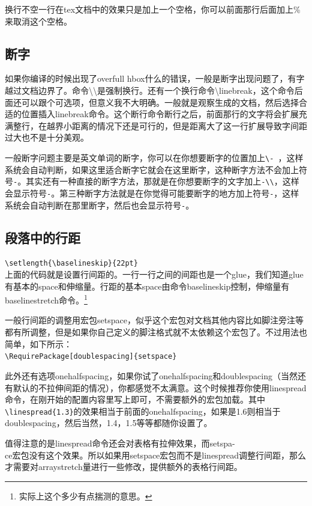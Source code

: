 \documentclass[12pt,oneside]{book}
\begin{document}
\begin{common-format}
换行不空一行在tex文档中的效果只是加上一个空格，你可以前面那行后面加上\%{}来取消这个空格。


\subsection{断字}
如果你编译的时候出现了overfull hbox什么的错误，一般是断字出现问题了，有字越过文档边界了。命令\textbackslash \textbackslash 是强制换行。还有一个换行命令\textbackslash linebreak，这个命令后面还可以跟个可选项，但意义我不大明确。一般就是观察生成的文档，然后选择合适的位置插入linebreak命令。这个断行命令断行之后，前面那行的文字将会扩展充满整行，在越界小距离的情况下还是可行的，但是距离大了这一行扩展导致字间距过大也不是十分美观。

一般断字问题主要是英文单词的断字，你可以在你想要断字的位置加上\verb+\- +，这样系统会自动判断，如果这里适合断字它就会在这里断字，这种断字方法不会加上符号\verb+-+。其实还有一种直接的断字方法，那就是在你想要断字的文字加上\verb+-\\+，这样会显示符号\verb+-+。第三种断字方法就是在你觉得可能要断字的地方加上符号\verb+-+，这样系统会自动判断在那里断字，然后也会显示符号\verb+-+。



\subsection[段落中的行距]{段落中的行距}
\verb+\setlength{\baselineskip}{22pt}+\\
上面的代码就是设置行间距的。一行一行之间的间距也是一个glue，我们知道glue有基本的space和伸缩量。行距的基本space由命令baselineskip控制，伸缩量有baselinestretch命令。\footnote{实际上这个多少有点揣测的意思。}

一般行间距的调整用宏包setspace，似乎这个宏包对文档其他内容比如脚注旁注等都有所调整，但是如果你自己定义的脚注格式就不太依赖这个宏包了。不过用法也简单，如下所示：\\
\verb+\RequirePackage[doublespacing]{setspace}+

此外还有选项onehalfspacing，如果你试了onehalfspacing和doublespacing（当然还有默认的不拉伸间距的情况），你都感觉不太满意。这个时候推荐你使用linespread命令，在刚开始的配置内容里写上即可，不需要额外的宏包加载。其中\verb+\linespread{1.3}+的效果相当于前面的onehalfspacing，如果是1.6则相当于doublespacing，然后当然，1.4，1.5等等都随你设置了。

\label{sec:段落中的行距}
值得注意的是linespread命令还会对表格有拉伸效果，而setspa-\\ce宏包没有这个效果。所以如果用setspace宏包而不是linespread调整行间距，那么才需要对arraystretch量进行一些修改，提供额外的表格行间距。



\end{common-format}
\end{document}
